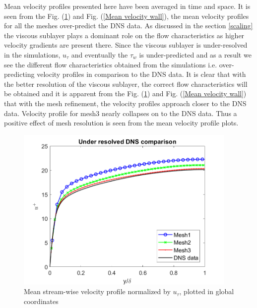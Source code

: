Mean velocity profiles presented here have been averaged in time and space. It is seen from the Fig. (\ref{Mean velocity global}) and Fig. (\ref{Mean velocity wall}), the mean velocity profiles for all the meshes over-predict the DNS data. As discussed in the section \ref{scaling} the viscous sublayer plays a dominant role on the flow characteristics as higher velocity gradients are present there. Since the viscous sublayer is under-resolved in the simulations, $u_\tau$ and eventually the $\tau_w$ is under-predicted and as a result we see the different flow characteristics obtained from the simulations i.e. over-predicting velocity profiles in comparison to the DNS data. It is clear that with the better resolution of the viscous sublayer, the correct flow characteristics will be obtained and it is apparent from the Fig. (\ref{Mean velocity global}) and Fig. (\ref{Mean velocity wall}) that with the mesh refinement, the velocity profiles approach closer to the DNS data. Velocity profile for mesh3 nearly collapses on to the DNS data. Thus a positive effect of mesh resolution is seen from the mean velocity profile plots. 
%
\begin{figure}[h]
    \centering
    \includegraphics[width=0.95\textwidth]{06_Resultsanddiscussion/figur/UDNS_2016/Profile_global_coords.png}
    \caption{Mean stream-wise velocity profile normalized by $u_\tau$, plotted in global coordinates}
    \label{Mean velocity global}
\end{figure}

